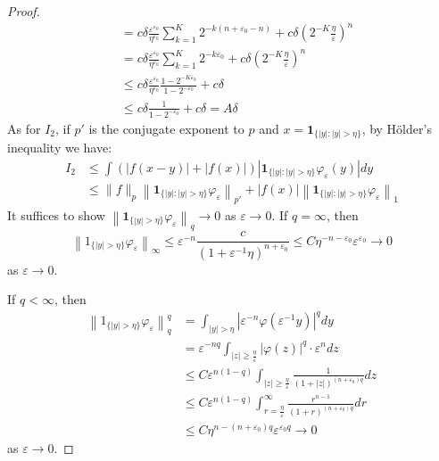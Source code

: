 \begin{proof}
$$\begin{aligned}
&=c \delta \frac{\varepsilon^{\varepsilon_0}}{\eta^{\varepsilon_0}} \sum_{k=1}^K 2^{-k(n+\varepsilon_0-n)} + c \delta \left(2^{-K} \frac{\eta}{\varepsilon}\right)^n \\
&= c \delta \frac{\varepsilon^{\varepsilon_0}}{\eta^{\varepsilon_0}} \sum_{k=1}^K 2^{-k\varepsilon_0} + c \delta \left(2^{-K} \frac{\eta}{\varepsilon}\right)^n \\
&\leq c \delta \frac{\varepsilon^{\varepsilon_0}}{\eta^{\varepsilon_0}} \frac{1 - 2^{-K\varepsilon_0}}{1 - 2^{-\varepsilon_0}} + c \delta \\
&\leq c \delta \frac{1}{1 - 2^{-\varepsilon_0}} + c \delta = A \delta
\end{aligned}
$$
As for $I_2$, if $p'$ is the conjugate exponent to $p$ and $x = \textbf{1}_{\{|y|: |y| > \eta\}}$, by Hölder's inequality we have:
$$
\begin{aligned}
I_2 &\leqslant \int (|f(x-y)| + |f(x)|) \left| \textbf{1}_{\{|y|: |y| > \eta\}} \varphi_{\varepsilon}(y) \right| dy \\
&\leqslant \|f\|_p \left\| \textbf{1}_{\{|y|: |y| > \eta\}} \varphi_{\varepsilon} \right\|_{p'} + |f(x)| \left\| \textbf{1}_{\{|y|: |y| > \eta\}} \varphi_{\varepsilon} \right\|_1
\end{aligned}
$$
It suffices to show $\left\| \textbf{1}_{\{|y| > \eta\}} \varphi_{\varepsilon} \right\|_q \rightarrow 0$ as $\varepsilon \rightarrow 0$.
 If $q = \infty$, then
$$
\left\| 1_{\{|y| > \eta\}} \varphi_{\varepsilon} \right\|_{\infty} \leqslant \varepsilon^{-n} \frac{c}{(1 + \varepsilon^{-1} \eta)^{n+\varepsilon_0}} \leq C \eta^{-n-\varepsilon_0} \varepsilon^{\varepsilon_0} \rightarrow 0
$$
as $\varepsilon \rightarrow 0$.

If $q < \infty$, then
$$
\begin{aligned}
\left\| 1_{\{|y| > \eta\}} \varphi_{\varepsilon} \right\|_q^q &= \int_{|y| > \eta} \left| \varepsilon^{-n} \varphi\left(\varepsilon^{-1} y\right) \right|^q dy \\
&= \varepsilon^{-nq} \int_{|z| \geqslant \frac{\eta}{\varepsilon}} |\varphi(z)|^q \cdot \varepsilon^n dz \\
&\leq C \varepsilon^{n(1-q)} \int_{|z| \geqslant \frac{\eta}{\varepsilon}} \frac{1}{(1 + |z|)^{(n+\varepsilon_0)q}} dz \\
&\leq C \varepsilon^{n(1-q)} \int_{r = \frac{\eta}{\varepsilon}}^{\infty} \frac{r^{n-1}}{(1 + r)^{(n+\varepsilon_0)q}} dr \\
&\leq C \eta^{n - (n + \varepsilon_0)q} \varepsilon^{\varepsilon_0 q} \longrightarrow 0
\end{aligned}
$$
as $\varepsilon \rightarrow 0$.
\end{proof} 
